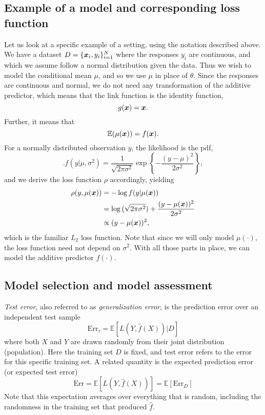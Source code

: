 \subsection{Example of a model and corresponding loss function}
Let us look at a specific example of a setting, using the notation described above.
We have a dataset $D=\{\bm{x}_i,y_i\}_{i=1}^N$ where the responses $y_i$ are continuous, and which we assume follow a normal distribution given the data.
Thus we wish to model the conditional mean $\mu$, and so we use $\mu$ in place of $\theta$.
Since the responses are continuous and normal, we do not need any transformation of the additive predictor, which means that the link function is the identity function,
\begin{equation*}
    g(\bm{x})=\bm{x}.
\end{equation*}
Further, it means that
\begin{equation*}
    \mathbb{E}(\mu(\bm{x}))=f(\bm{x}).
\end{equation*}
For a normally distributed observation $y$, the likelihood is the pdf,
\begin{equation*}
    .f(y|\mu,\sigma^2)=\frac{1}{\sqrt{2\pi\sigma^2}}\exp\left\{-\frac{(y-\mu)^2}{2\sigma^2}\right\},
\end{equation*}
and we derive the loss function $\rho$ accordingly, yielding
\begin{align*}
    \rho(y,\mu(\bm{x}))&=-\log{f(y|\mu(\bm{x}))}\\
    &=\log{(\sqrt{2\pi\sigma^2})}+\frac{(y-\mu(\bm{x}))^2}{2\sigma^2} \\
    &\propto(y-\mu(\bm{x}))^2,
\end{align*}
which is the familiar $L_2$ loss function. Note that since we will only model $\mu(\cdot)$, the loss function need not depend on $\sigma^2$. With all those parts in place, we can model the additive predictor $f(\cdot)$.

\subsection{Model selection and model assessment}
\textit{Test error}, also referred to as \textit{generalization error}, is the prediction error over an independent test sample
\begin{equation}\label{eq:test-error}
    \text{Err}_{\tau}=\mathbb{E}[L(Y,\hat{f}(X))|D]
\end{equation}
where both $X$ and $Y$ are drawn randomly from their joint distribution (population).
Here the training set $D$ is fixed, and test error refers to the error for this specific training set.
A related quantity is the expected prediction error (or expected test error)
\begin{equation*}
    \text{Err}=\mathbb{E}[L(Y,\hat{f}(X))]=\mathbb{E}\left[\text{Err}_D\right]
\end{equation*}
Note that this expectation averages over everything that is random, including the randomness in the training set that produced $\hat{f}$.

